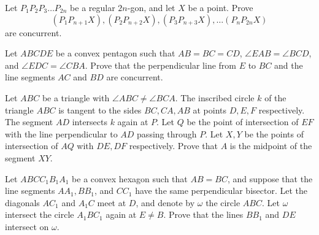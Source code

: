 \documentclass[mast]{lucky}
\begin{document}
\begin{prob}{4}
Let $P_1P_2P_3\dots P_{2n}$ be a regular $2n$-gon, and let $X$ be a point. Prove \[(P_1P_{n+1}X), (P_2P_{n+2}X), (P_3P_{n+3}X),\dots (P_nP_{2n}X)\] are concurrent.
\end{prob}

\begin{prob}[ISL 2017/G1]{6}
Let $ABCDE$ be a convex pentagon such that $AB=BC=CD$, $\angle{EAB}=\angle{BCD}$, and $\angle{EDC}=\angle{CBA}$. Prove that the perpendicular line from $E$ to $BC$ and the line segments $AC$ and $BD$ are concurrent.
\end{prob}

\begin{prob}{6}
Let $ABC$ be a triangle with $\angle  ABC \ne \angle  BCA$. The inscribed circle $k$ of the triangle $ABC$ is tangent to the sides $BC, CA,AB$ at points $D, E , F$ respectively. The segment $AD$ intersects $k$ again at $P$. Let $Q$ be the point of intersection of $EF$ with the line perpendicular to $AD$ passing through $P$. Let $X,Y$ be the points of intersection of $AQ$ with $DE,DF$ respectively. Prove that $A$ is the midpoint of the segment $XY$.
\end{prob}

\begin{prob}[ISL 2017 G5]{9}
Let $ABCC_1B_1A_1$ be a convex hexagon such that $AB=BC$, and suppose that the line segments $AA_1, BB_1$, and $CC_1$ have the same perpendicular bisector. Let the diagonals $AC_1$ and $A_1C$ meet at $D$, and denote by $\omega$ the circle $ABC$. Let $\omega$ intersect the circle $A_1BC_1$ again at $E \neq B$. Prove that the lines $BB_1$ and $DE$ intersect on $\omega$.
\end{prob}
\end{document}
